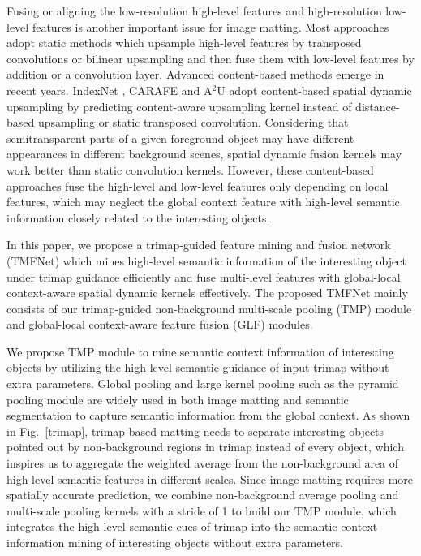 \documentclass[10pt,twocolumn,letterpaper]{article}
\begin{document}
Fusing or aligning the low-resolution high-level features and high-resolution low-level features is another important issue for image matting. Most approaches \cite{deepmatting,gca,fba,sim}
adopt static methods which upsample high-level features by transposed convolutions or bilinear upsampling and then fuse them with low-level features by addition or a convolution layer.   Advanced content-based methods emerge in recent years.  IndexNet \cite{indexnet}, CARAFE \cite{carafe} and A$^2$U \cite{a2u} adopt content-based spatial dynamic upsampling by predicting content-aware upsampling kernel instead of distance-based upsampling or static transposed convolution. Considering that semitransparent parts of a given foreground object may have different appearances in different background scenes, spatial dynamic fusion kernels may work better than  static convolution kernels.  However, these content-based approaches fuse the high-level and low-level features only depending on local features, which may neglect the global context feature with high-level semantic information closely related to the interesting objects.


In this paper, we propose a trimap-guided feature mining and fusion network (TMFNet) which mines high-level semantic information of the interesting object under trimap guidance efficiently and fuse multi-level features with global-local context-aware spatial dynamic kernels effectively. The proposed TMFNet mainly consists of our trimap-guided non-background multi-scale pooling (TMP) module and  global-local context-aware feature fusion (GLF) modules. 

We propose TMP module to mine semantic context information of interesting objects by utilizing the high-level semantic guidance of input trimap without extra parameters. Global pooling and large kernel pooling such as the pyramid pooling module \cite{psp} are widely used in both image matting \cite{fba} and semantic segmentation \cite{upernet}  to capture semantic information from the global context. As shown in Fig.~\ref{trimap}, trimap-based matting needs to separate interesting objects pointed out by non-background regions in trimap  instead of every object, which inspires us to aggregate the weighted average from the non-background area of high-level semantic features in different scales. Since image matting requires more spatially accurate prediction, we combine non-background average pooling and  multi-scale pooling kernels with a stride of 1 to build our TMP module, which integrates the high-level semantic cues of trimap into the semantic context information mining of interesting objects without extra parameters.
\end{document}

